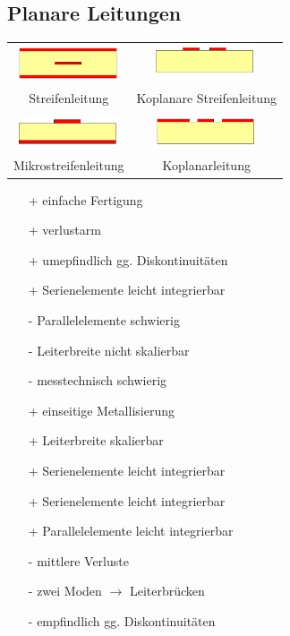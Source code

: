 \documentclass[english]{latex4ei/latex4ei_sheet}
\begin{document}
\begin{sectionbox}
	\subsection{Planare Leitungen}
	\begin{tabular*}{\columnwidth}{cc}
		\includegraphics[width = 3cm]{./img/streifenleitung.png} & \includegraphics[width = 3cm]{./img/koplanar_streifen_leitung.png}\\
		Streifenleitung & Koplanare Streifenleitung\\
		\hline\\
		\includegraphics[width = 3cm]{./img/mikrostreifen_leitung.png} & \includegraphics[width = 3cm]{./img/koplanar_leitung.png}\\
		Mikrostreifenleitung & Koplanarleitung\\
	\end{tabular*}
	\vspace{-6mm}
	\begin{multicols*}{2}
	\begin{itemize}
		\item[+] einfache Fertigung
		\item[+] verlustarm
		\item[+] umepfindlich gg. Diskontinuitäten
		\item[+] Serienelemente leicht integrierbar
		\item[-] Parallelelemente schwierig
		\item[-] Leiterbreite nicht skalierbar
		\item[-] messtechnisch schwierig
	\end{itemize}
	\columnbreak
	\begin{itemize}
		\item[+] einseitige Metallisierung
		\item[+] Leiterbreite skalierbar
		\item[+] Serienelemente leicht integrierbar
		\item[+] Serienelemente leicht integrierbar
		\item[+] Parallelelemente leicht integrierbar
		\item[-] mittlere Verluste
		\item[-] zwei Moden $\rightarrow$ Leiterbrücken 
		\item[-] empfindlich gg. Diskontinuitäten 
	\end{itemize}
\end{multicols*}


\end{sectionbox}
\end{document}
